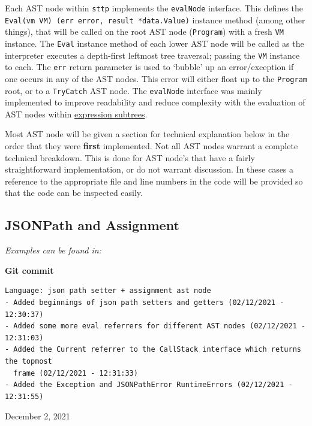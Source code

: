 \documentclass[]{full}
\theoremstyle{definition}
\begin{document}
Each AST node within \verb|sttp| implements the \verb|evalNode| interface. This defines the \texttt{Eval(vm VM) (err error, result *data.Value)} instance method (among other things), that will be called on the root AST node (\verb|Program|) with a fresh \verb|VM| instance. The \verb|Eval| instance method of each lower AST node will be called as the interpreter executes a depth-first leftmost tree traversal; passing the \verb|VM| instance to each. The \verb|err| return parameter is used to `bubble' up an error/exception if one occurs in any of the AST nodes. This error will either float up to the \verb|Program| root, or to a \verb|TryCatch| AST node. The \verb|evalNode| interface was mainly implemented to improve readability and reduce complexity with the evaluation of AST nodes within \hyperref[sec:development-ast-nodes-expressions]{expression subtrees}.

Most AST node will be given a section for technical explanation below in the order that they were \textbf{first} implemented. Not all AST nodes warrant a complete technical breakdown. This is done for AST node's that have a fairly straightforward implementation, or do not warrant discussion. In these cases a reference to the appropriate file and line numbers in the code will be provided so that the code can be inspected easily.

\subsection{JSONPath and Assignment}

\textit{Examples can be found in: }

\begin{center}
    \textbf{Git commit}
    \begin{verbatim}
Language: json path setter + assignment ast node
- Added beginnings of json path setters and getters (02/12/2021 - 12:30:37)
- Added some more eval referrers for different AST nodes (02/12/2021 - 12:31:03)
- Added the Current referrer to the CallStack interface which returns the topmost
  frame (02/12/2021 - 12:31:33)
- Added the Exception and JSONPathError RuntimeErrors (02/12/2021 - 12:31:55)
    \end{verbatim}
    \vspace{-1em}
    \tiny{December 2, 2021}
\end{center}
\end{document}
